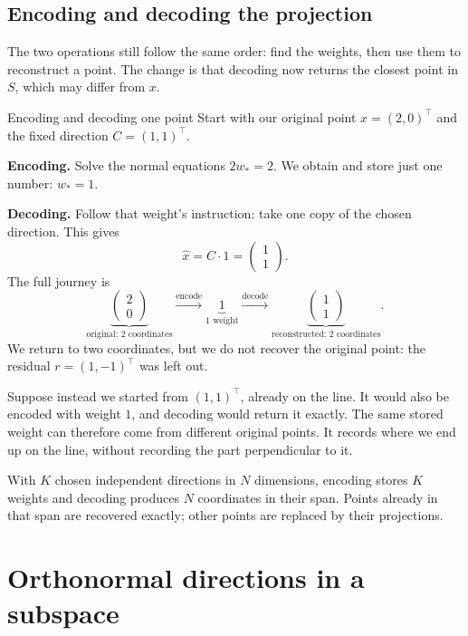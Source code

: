 \documentclass[a4paper,12pt,oneside]{report}
\begin{document}
\subsection{Encoding and decoding the projection}

The two operations still follow the same order: find the weights,
then use them to reconstruct a point. The change is that decoding
now returns the closest point in $S$, which may differ from $x$.

\begin{framedexample}{Encoding and decoding one point}
Start with our original point $x=(2,0)^\top$ and the fixed direction
$C=(1,1)^\top$.

\textbf{Encoding.} Solve the normal equations $2w_*=2$.
We obtain and store just one number: $w_*=1$.

\textbf{Decoding.} Follow that weight's instruction: take one copy
of the chosen direction. This gives
\[
  \hat{x}=C\cdot1=\begin{pmatrix}1\\1\end{pmatrix}.
\]
The full journey is
\[
  \underbrace{\begin{pmatrix}2\\0\end{pmatrix}}_{\text{original: 2 coordinates}}
  \xrightarrow{\text{encode}}
  \underbrace{1}_{\text{1 weight}}
  \xrightarrow{\text{decode}}
  \underbrace{\begin{pmatrix}1\\1\end{pmatrix}}_{\text{reconstructed: 2 coordinates}}.
\]
We return to two coordinates, but we do not recover the original
point: the residual $r=(1,-1)^\top$ was left out.

Suppose instead we started from $(1,1)^\top$, already on the line.
It would also be encoded with weight $1$, and decoding would return
it exactly. The same stored weight can therefore come from different
original points. It records where we end up on the line, without
recording the part perpendicular to it.
\end{framedexample}

With $K$ chosen independent directions in $N$ dimensions, encoding
stores $K$ weights and decoding produces $N$ coordinates in their
span. Points already in that span are recovered exactly; other
points are replaced by their projections.

\clearpage
\section{Orthonormal directions in a subspace}
\end{document}
